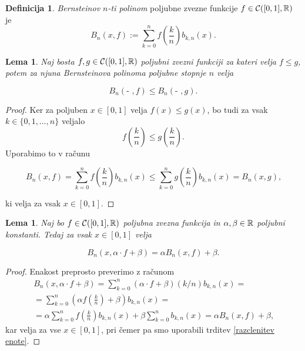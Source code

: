 \documentclass[a4paper, reqno]{amsart}
\theoremstyle{theorem}
\newtheorem{lema}[izrek]{Lema}
\theoremstyle{definition}
\newtheorem{definicija}{Definicija}[section]
\begin{document}
\begin{definicija}
	\emph{Bernsteinov $n$-ti polinom} poljubne zvezne funkcije $f \in \mathcal{C}([0,1],\mathbb{R})$ je
	$$ B_n(x, f) := \sum_{k = 0}^n f\left(\frac kn\right)b_{k,n}(x)\text{.}$$

\end{definicija}

\begin{lema}
	\label{monotonost}
	Naj bosta $f, g \in \mathcal{C}([0,1],\mathbb{R})$ poljubni zvezni funkciji za kateri velja $f \leq g$, potem za
	njuna Bernsteinova polinoma poljubne stopnje $n$ velja

	$$ B_n(\text{- },f) \leq B_n(\text{- },g)\text{.}$$ 
\end{lema}

\begin{proof}
	Ker za poljuben $x \in [0,1]$ velja $f(x) \leq g(x)$, bo tudi za vsak $k \in \{0,1,\dots, n\}$
	veljalo
	$$ f\left(\frac kn\right) \leq g\left(\frac kn\right)\text{.}$$
	Uporabimo to v računu

	$$ B_n(x, f) = \sum_{k = 0}^n f\left(\frac kn\right)b_{k,n}(x) \leq 
	\sum_{k = 0}^n g\left(\frac kn\right)b_{k,n}(x) = B_n(x, g)\text{,}$$

	ki velja za vsak $x \in [0,1]$.
\end{proof}

\begin{lema}
	\label{linearnost}
	Naj bo $f \in \mathcal{C}([0,1],\mathbb{R})$ poljubna zvezna funkcija in $\alpha, \beta \in \mathbb{R}$ poljubni konstanti.
	Tedaj za vsak $x \in [0,1]$ velja 

	$$ B_n(x, \alpha \cdot f + \beta) = \alpha B_n(x, f) + \beta\text{.}$$
\end{lema}

\begin{proof}
	Enakost preprosto preverimo z računom
	\begin{multline*}
	B_n(x, \alpha \cdot f + \beta) = 
	\sum_{k = 0}^n (\alpha \cdot f + \beta)\left( k/n \right)b_{k,n}(x) =\\
	= \sum_{k = 0}^n (\alpha f\left(\frac kn \right) + \beta)b_{k,n}(x) =\\
	= \alpha \sum_{k = 0}^n f\left(\frac kn\right)b_{k,n}(x) + \beta \sum_{k = 0}^n b_{k,n}(x) =
	\alpha B_n(x, f) + \beta\text{,}
\end{multline*}
kar velja za vse $x \in [0,1]$, pri čemer pa smo uporabili trditev \ref{razclenitev enote}.
\end{proof}
\end{document}
